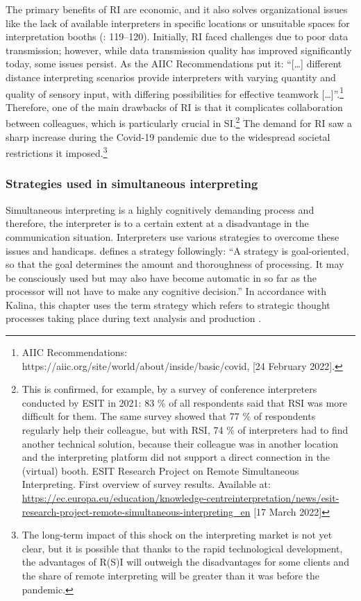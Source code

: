 \documentclass[output=paper]{langscibook}
\begin{document}
The primary benefits of RI are economic, and it also solves organizational issues like the lack of available interpreters in specific locations or unsuitable spaces for interpretation booths (\citealt{ZieglerGigliobianco2018}: 119–120). Initially, RI faced challenges due to poor data transmission; however, while data transmission quality has improved significantly today, some issues persist. As the AIIC Recommendations put it: “[…] different distance interpreting scenarios provide interpreters with varying quantity and quality of sensory input, with differing possibilities for effective teamwork […]”.\footnote{{AIIC Recommendations: https://aiic.org/site/world/about/inside/basic/covid, [24  {February 2022}].}} Therefore, one of the main drawbacks of RI is that it complicates collaboration between colleagues, which is particularly crucial in SI.\footnote{{This is confirmed, for example, by a survey of conference interpreters conducted by ESIT in 2021: 83 \% of all respondents said that RSI was more difficult for them. The same survey showed that 77 \% of respondents regularly help their colleague, but with RSI, 74 \% of interpreters had to find another technical solution, because their colleague was in another location and the interpreting platform did not support a direct connection in the (virtual) booth. ESIT Research Project on Remote Simultaneous Interpreting. First overview of survey results. Available at:} \url{https://ec.europa.eu/education/knowledge-centreinterpretation/news/esit-research-project-remote-simultaneous-interpreting_en} {[17  {March 2022}]}} The demand for RI saw a sharp increase during the Covid-19 pandemic due to the widespread societal restrictions it imposed.\footnote{{The long-term impact of this shock on the interpreting market is not yet clear, but it is possible that thanks to the rapid technological development, the advantages of R(S)I will outweigh the disadvantages for some clients and the share of remote interpreting will be greater than it was before the pandemic.}}

\subsubsection{Strategies used in simultaneous interpreting} %

Simultaneous interpreting is a highly cognitively demanding process and therefore, the interpreter is to a certain extent at a disadvantage in the communication situation. Interpreters use various strategies to overcome these issues and handicaps. \citet[123]{Kalina1992} defines a strategy followingly: “A strategy is goal-oriented, so that the goal determines the amount and thoroughness of processing. It may be consciously used but may also have become automatic in so far as the processor will not have to make any cognitive decision.” In accordance with Kalina, this chapter uses the term strategy which refers to strategic thought processes taking place during text analysis and production \citep[115]{Kalina1998}.
\end{document}

